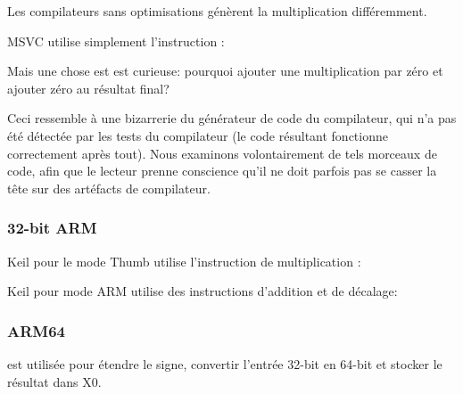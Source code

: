 Les compilateurs sans optimisations génèrent la multiplication différemment.



MSVC \NonOptimizing utilise simplement l'instruction \IMUL:



\myindex{\CompilerAnomaly}
\label{MSVC2013_anomaly}

Mais une chose est est curieuse: pourquoi ajouter une multiplication par zéro et
ajouter zéro au résultat final?

Ceci ressemble à une bizarrerie du générateur de code du compilateur, qui n'a pas
été détectée par les tests du compilateur (le code résultant fonctionne correctement
après tout).
%
Nous examinons volontairement de tels morceaux de code, afin que le lecteur prenne
conscience qu'il ne doit parfois pas se casser la tête sur des artéfacts de compilateur.

\subsubsection{32-bit ARM}

Keil \Optimizing pour le mode Thumb utilise l'instruction de multiplication :



Keil \Optimizing pour mode ARM utilise des instructions d'addition et de décalage:



\subsubsection{ARM64}




 est utilisée pour étendre le signe, convertir l'entrée 32-bit en 64-bit
et stocker le résultat dans X0.

